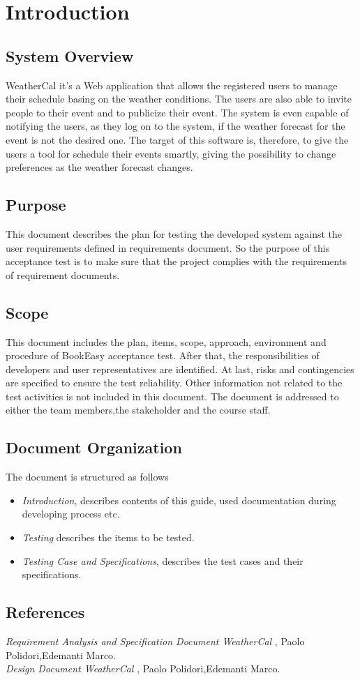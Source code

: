 \chapter{Introduction} \label{cap:cap1}
\section{System Overview}
WeatherCal  it's a Web application that allows the registered users to manage their schedule basing on the weather conditions. The users are also able to invite people to their event and to publicize their event. The system is even capable of notifying the users, as they log on to the system, if the weather forecast for the event is not the desired one. The target of this software is, therefore, to give the users a tool for schedule their events smartly, giving the possibility to change preferences as the weather forecast changes.
\section{Purpose}
This document describes the plan for testing the developed system against the user requirements defined in requirements document. So the purpose of this acceptance test is to make sure that the project complies with the requirements of requirement documents.
\section{Scope}
This document includes the plan, items, scope, approach, environment and procedure of BookEasy acceptance test. After that, the responsibilities of developers and user representatives are identified. At last, risks and contingencies are specified to ensure the test reliability. Other information not related to the test activities is not included in this document.
The document is addressed to either the team members,the  stakeholder and the course staff.
\section{Document Organization}
The document is structured as follows 
\begin{itemize}
\item {\it Introduction}, describes contents of this guide, used documentation during developing process etc.
\item {\it Testing} describes the items to be tested.
\item {\it Testing Case and Specifications}, describes the test cases and their specifications.
\end{itemize}
\section{References}
{\it Requirement Analysis and Specification Document WeatherCal },  Paolo Polidori,Edemanti Marco.\\
{\it Design Document WeatherCal },  Paolo Polidori,Edemanti Marco.

 
 
 
 
 
 